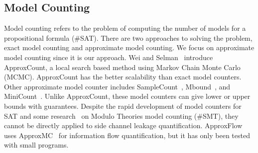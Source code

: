 \subsection{Model Counting}
Model counting refers to the problem of computing the number of 
models for a propositional formula (\#SAT). There are two approaches to
solving the problem, exact model counting and approximate model 
counting. We focus on approximate model counting since it is our approach. Wei and Selman~\cite{wei2005new} introduce
ApproxCount, a local search based method using Markov Chain Monte 
Carlo (MCMC). ApproxCount has the better scalability than 
exact model counters. Other approximate model counter includes 
SampleCount~\cite{gomes2007sampling},
Mbound~\cite{gomes2006model}, and MiniCount~\cite{kroc2008leveraging}. 
Unlike ApproxCount,
these model counters can give lower or upper bounds with guarantees.
Despite the rapid development of model counters for SAT and some 
research~\cite{chistikov2017approximate,phan2015model} on Modulo Theories model counting (\#SMT),
they cannot be directly applied to 
side channel leakage quantification.
ApproxFlow~\cite{biondi2018scalable} uses ApproxMC~\cite{chakraborty2016algorithmic} for information flow quantification,
but it has only been tested with small programs.
